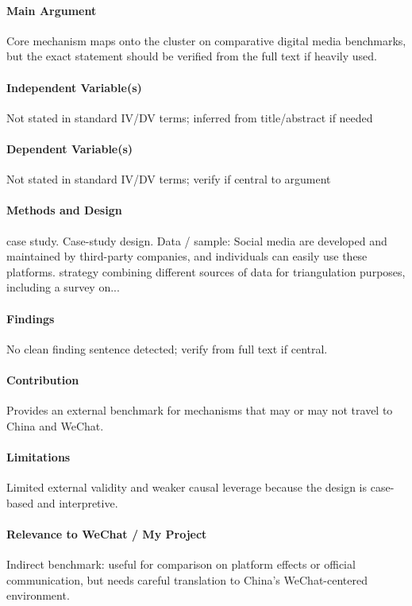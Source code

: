 \documentclass[12pt]{article}
\begin{document}
\paragraph{Main Argument} Core mechanism maps onto the cluster on comparative digital media benchmarks, but the exact statement should be verified from the full text if heavily used.

\paragraph{Independent Variable(s)} Not stated in standard IV/DV terms; inferred from title/abstract if needed

\paragraph{Dependent Variable(s)} Not stated in standard IV/DV terms; verify if central to argument

\paragraph{Methods and Design} case study. Case-study design. Data / sample: Social media are developed and maintained by third-party companies, and individuals can easily use these platforms. strategy combining different sources of data for triangulation purposes, including a survey on...

\paragraph{Findings} No clean finding sentence detected; verify from full text if central.

\paragraph{Contribution} Provides an external benchmark for mechanisms that may or may not travel to China and WeChat.

\paragraph{Limitations} Limited external validity and weaker causal leverage because the design is case-based and interpretive.

\paragraph{Relevance to WeChat / My Project} Indirect benchmark: useful for comparison on platform effects or official communication, but needs careful translation to China's WeChat-centered environment.
\end{document}
